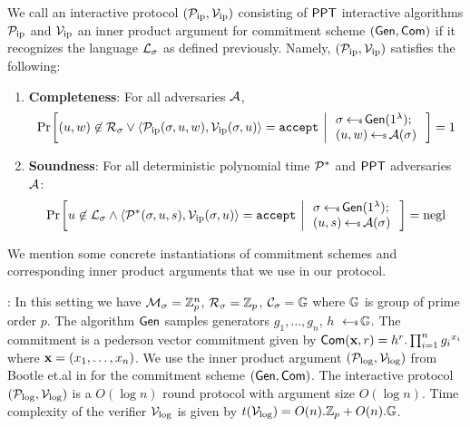 \begin{definition}\label{defn:innerproductarg}
We call an interactive protocol $(\mathcal{P}_\mathrm{ip},\mathcal{V}_\mathrm{ip})$ consisting of $\mathsf{PPT}$ interactive algorithms
$\mathcal{P}_\mathrm{ip}$ and $\mathcal{V}_\mathrm{ip}$ an inner product argument for commitment scheme
$(\mathsf{Gen},\mathsf{Com})$ if it recognizes the language $\mathcal{L}_\sigma$ as defined
previously. Namely, $(\mathcal{P}_\mathrm{ip},\mathcal{V}_\mathrm{ip})$ satisfies the following:
\begin{enumerate}[{\rm (i)}]
\item {\bf Completeness}: For all adversaries $\mathcal{A}$,
\begin{align*}
\condprob{(u,w)\not\in \mc{R}_\sigma \vee \langle \pip(\sigma,u,w),\vip(\sigma,u)\rangle={\tt accept}}{
\begin{array}{l}
\sigma\sample \csetup(\secparam);\\
(u,w)\sample \adv(\sigma)
\end{array}
}=1
\end{align*}

\item{\bf Soundness}: For all deterministic polynomial time $\mathcal{P}^\ast$ and
$\mathsf{PPT}$ adversaries $\mathcal{A}$:
\begin{align*}
\condprob{u\not\in \mc{L}_\sigma \wedge \langle
\mc{P}^\ast(\sigma,u,s),\vip(\sigma,u)\rangle={\tt accept}}{
\begin{array}{l}
\sigma\sample \csetup(\secparam);\\
(u,s)\sample \adv(\sigma)
\end{array}
} = \negl
\end{align*}
\end{enumerate}
\end{definition}

We mention some concrete instantiations of commitment schemes and corresponding
inner product arguments that we use in our protocol.

: In this setting we have
$\mathcal{M}_\sigma=\mathbb{Z}^n_p$, $\mathcal{R}_\sigma=\mathbb{Z}_p$, $\mathcal{C}_\sigma=\mathbb{G}$ where $\mathbb{G}$
is group of prime order $p$. The algorithm $\mathsf{Gen}$ samples generators
$g_1,\ldots,g_n$, $h$ $\hskip2.3pt{\gets\!\!\mbox{\tiny${\$}$\normalsize}}\, \mathbb{G}$. The commitment is a pederson vector
commitment given by $\mathsf{Com}({\bf
x},r)=h^r.\prod_{i=1}^n {g_i}^{x_i}$ where ${\bf x}=(x_1,\ldots,x_n)$. We use
the inner product argument $(\mathcal{P}_\mathrm{log},\mathcal{V}_\mathrm{log})$ from Bootle et.al
in \cite{Bulletproofs} for the commitment scheme $(\mathsf{Gen},\mathsf{Com})$. The
interactive protocol $(\mathcal{P}_\mathrm{log},\mathcal{V}_\mathrm{log})$ is a $O(\log n)$ round protocol with
argument size $O(\log n)$. Time complexity of the verifier $\mathcal{V}_\mathrm{log}$ is given
by $t(\mathcal{V}_\mathrm{log})=O(n).\mathbb{Z}_p + O(n).\mathbb{G}$.\smallskip


